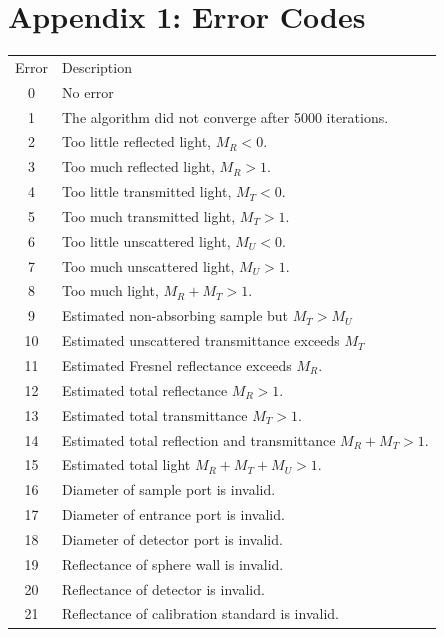 \documentclass{article}
\begin{document}
\clearpage
\section*{Appendix 1: Error Codes}


\begin{table}[!b]
\begin{center}
\begin{tabular}{cp{10cm}}
 Error & Description\\[3mm]

 0     & No error\\[2mm]

 1     & The algorithm did not converge after 5000 iterations.\\[2mm]

 2     & Too little reflected light, $M_R < 0$.   \\
 3     & Too much reflected light, $M_R > 1$.     \\
 4     & Too little transmitted light, $M_T < 0$.  \\
 5     & Too much transmitted light, $M_T > 1$.  \\
 6     & Too little unscattered light, $M_U < 0$. \\
 7     & Too much unscattered light, $M_U > 1$.    \\
 8     & Too much light, $M_R+M_T > 1$.\\[2mm]

 9     & Estimated non-absorbing sample but $M_T>M_U$  \\
 10    & Estimated unscattered transmittance exceeds $M_T$\\
 11    & Estimated Fresnel reflectance exceeds $M_R$.\\
 12    & Estimated total reflectance $M_R>1$.  \\
 13    & Estimated total transmittance $M_T>1$. \\
 14    & Estimated total reflection and transmittance $M_R+M_T>1$. \\
 15    & Estimated total light $M_R+M_T+M_U>1$.\\[2mm]

 16    & Diameter of sample port is invalid. \\
 17    & Diameter of entrance port is invalid. \\
 18    & Diameter of detector port is invalid.\\[2mm]

 19    & Reflectance of sphere wall is invalid. \\
 20    & Reflectance of detector is invalid. \\
 21    & Reflectance of calibration standard is invalid.\\[2mm]


\end{tabular}
\end{center}
\end{table}
\end{document}
